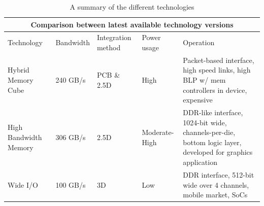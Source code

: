 \begin{table}[h!]
    \centering
    \begin{tabular}{ |p{}||p{}|p{}|p{}|p{}|  }
        \hline
        \multicolumn{5}{|c|}{Comparison between latest available technology versions} \\
        \hline
        Technology & Bandwidth & Integration method & Power usage & Operation\\
        \hline
        Hybrid Memory Cube    & 240 GB/s & PCB \& 2.5D & High           & Packet-based interface, high speed links, high BLP w/ mem controllers in device, expensive\\
        High Bandwidth Memory & 306 GB/s & 2.5D        & Moderate-High  & DDR-like interface, 1024-bit wide, channels-per-die, bottom logic layer, developed for graphics application\\
        Wide I/O              & 100 GB/s & 3D          & Low            & DDR interface, 512-bit wide over 4 channels, mobile market, SoCs\\
        \hline
    \end{tabular}
    \caption{A summary of the different technologies}
    \label{tab:tech-compare}
\end{table}
